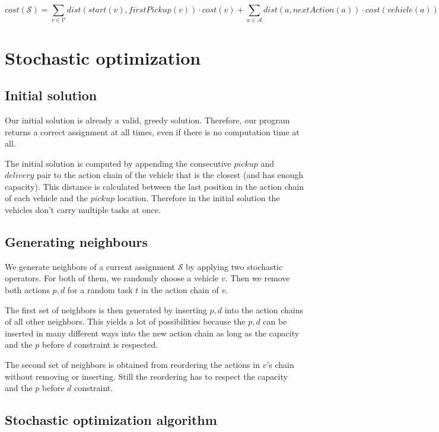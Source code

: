 \documentclass[11pt]{article}
\begin{document}
$$
cost(\mathcal{S}) = 
\sum_{v \in \mathcal{V}} dist(start(v), firstPickup(v))
\cdot cost(v)
 +
\sum_{a \in \mathcal{A}} dist(a, nextAction(a))
\cdot cost(vehicle(a))
$$


\section{Stochastic optimization}

\subsection{Initial solution}

Our initial solution is already a valid, greedy solution. Therefore, our program
returns a correct assignment at all times, even if there is no computation time
at all.

The initial solution is computed by appending the consecutive $pickup$ and
$delivery$ pair to the action chain of the vehicle that is the closest (and has
enough capacity). This distance is calculated between the last position in the
action chain of each vehicle and the $pickup$ location. Therefore in the initial
solution the vehicles don't carry multiple tasks at once.


\subsection{Generating neighbours}

We generate neighbors of a current assignment $\mathcal{S}$ by applying two
stochastic operators. For both of them, we randomly choose a vehicle $v$. Then
we remove both actions $p, d$ for a random task $t$ in the action chain of $v$.

The first set of neighbors is then generated by inserting $p, d$ into the action
chains of all other neighbors. This yields a lot of possibilities because the
$p, d$ can be inserted in many different ways into the new action chain as long
as the capacity and the $p$ before $d$ constraint is respected.

The second set of neighbors is obtained from reordering the actions in $v$'s
chain without removing or inserting. Still the reordering has to respect the
capacity and the $p$ before $d$ constraint.


\subsection{Stochastic optimization algorithm}
\end{document}
